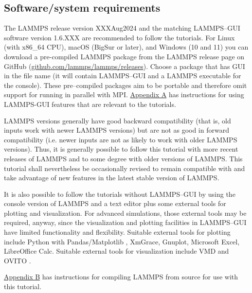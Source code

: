 \documentclass[9pt,tutorial]{livecoms}
\begin{document}
\subsection{Software/system requirements}

The LAMMPS release version XXXAug2024 \cite{lammps_code} and the
matching LAMMPS--GUI software version 1.6.XXX are recommended to follow
the tutorials.  For Linux (with x86\_64 CPU), macOS (BigSur or later),
and Windows (10 and 11) you can download a pre-compiled LAMMPS package
from the LAMMPS release page on GitHub
(\href{https://github.com/lammps/lammps/releases}{github.com/lammps/lammps/releases}).
Choose a package that has GUI in the file name (it will contain
LAMMPS--GUI and a LAMMPS executable for the console).  These
pre--compiled packages aim to be portable and therefore omit support for
running in parallel with MPI. \hyperref[using-lammps-gui]{Appendix A}
has instructions for using LAMMPS-GUI features that are relevant to the
tutorials.

LAMMPS versions generally have good backward compatibility (that is, old
inputs work with newer LAMMPS versions) but are not as good in forward
compatibility (i.e. newer inputs are not as likely to work with older
LAMMPS versions).  Thus, it is generally possible to follow this tutorial
with more recent releases of LAMMPS and to some degree with older
versions of LAMMPS.  This tutorial shall nevertheless be occasionally
revised to remain compatible with and take advantage of new features in
the latest stable version of LAMMPS.

It is also possible to follow the tutorials without LAMMPS--GUI by using
the console version of LAMMPS and a text editor plus some external tools
for plotting and visualization.  For advanced simulations, those
external tools may be required, anyway, since the visualization and
plotting facilities in LAMMPS--GUI have limited functionality and
flexibility.  Suitable external tools for plotting include
Python with Pandas/Matplotlib \cite{van1995python,hunter2007Matplotlib},
XmGrace, Gnuplot, Microsoft Excel, LibreOffice Calc.  Suitable external
tools for visualization include VMD
\cite{vmd_home,humphrey1996vmd} and OVITO \cite{ovito_home,ovito_paper}.

\hyperref[compiling-lammps-label]{Appendix B} has instructions for
compiling LAMMPS from source for use with this tutorial.
\end{document}
